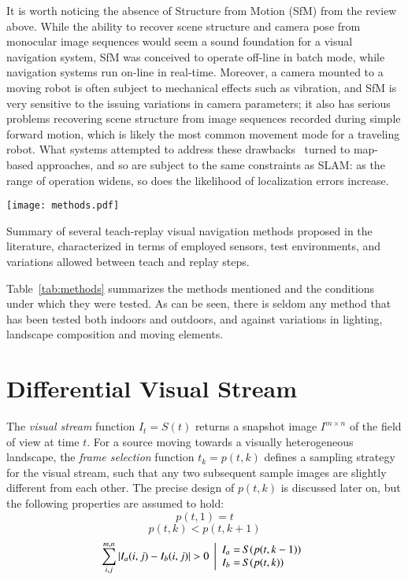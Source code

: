 \documentclass[twocolumn, 9pt,fleqn]{jsproceedings}
\begin{document}
It is worth noticing the absence of Structure from Motion (SfM) from the review above. While the ability to recover scene structure and camera pose from monocular image sequences would seem a sound foundation for a visual navigation system, SfM was conceived to operate off-line in batch mode, while navigation systems run on-line in real-time. Moreover, a camera mounted to a moving robot is often subject to mechanical effects such as vibration, and SfM is very sensitive to the issuing variations in camera parameters; it also has serious problems recovering scene structure from image sequences recorded during simple forward motion, which is likely the most common movement mode for a traveling robot. What systems attempted to address these drawbacks~\cite{BEA97,ROY07} turned to map-based approaches, and so are subject to the same constraints as SLAM: as the range of operation widens, so does the likelihood of localization errors increase.

\begin{table}[h!]
\centering
\texttt{[image: methods.pdf]}
\caption{Summary of several teach-replay visual navigation methods proposed in the literature, characterized in terms of employed sensors, test environments, and variations allowed between teach and replay steps.}
\label{tab:methods}
\end{table}

Table~\ref{tab:methods} summarizes the methods mentioned and the conditions under which they were tested. As can be seen, there is seldom any method that has been tested both indoors and outdoors, and against variations in lighting, landscape composition and moving elements.

\section{Differential Visual Stream}

The \textit{visual stream} function $I_t = S(t)$ returns a snapshot image $I^{m \times n}$ of the field of view at time $t$. For a source moving towards a visually heterogeneous landscape, the \textit{frame selection} function $t_k = p(t, k)$ defines a sampling strategy for the visual stream, such that any two subsequent sample images are slightly different from each other. The precise design of $p(t, k)$ is discussed later on, but the following properties are assumed to hold:
\begin{equation}
p(t, 1) = t
\end{equation}
\begin{equation}
p(t, k) < p(t, k+1)
\end{equation}
\begin{equation}
\sum_{i, j}^{m, n}{|I_a(i, j) - I_b(i, j)|} > 0 \; \left|
\begin{array}{r@{\hspace{2bp}} l}
I_a = & S(p(t, k-1)) \\
I_b = & S(p(t, k))
\end{array}
\right.
\end{equation}
\end{document}
